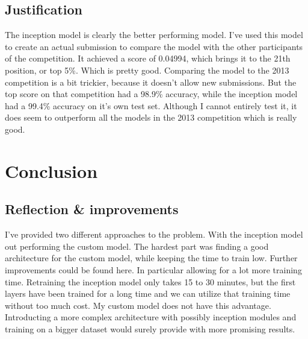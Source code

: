 \documentclass[11pt]{article}
\begin{document}
\subsection{Justification}
The inception model is clearly the better performing model. I've used this model to create an actual submission to compare the model with the other participants of the competition. It achieved a score of 0.04994, which brings it to the 21th position, or top 5\%. Which is pretty good.
Comparing the model to the 2013 competition is a bit trickier, because it doesn't allow new submissions. But the top score on that competition had a 98.9\% accuracy, while the inception model had a 99.4\% accuracy on it's own test set. Although I cannot entirely test it, it does seem to outperform all the models in the 2013 competition which is really good.
\section{Conclusion}
\subsection{Reflection \& improvements}
I've provided two different approaches to the problem. With the inception model out performing the custom model.  
The hardest part was finding a good architecture for the custom model, while keeping the time to train low. Further improvements could be found here. In particular allowing for a lot more training time. Retraining the inception model only takes 15 to 30 minutes, but the first layers have been trained for a long time and we can utilize that training time without too much cost. My custom model does not have this advantage. Introducting a more complex architecture with possibly inception modules and training on a bigger dataset would surely provide with more promising results.
\end{document}
